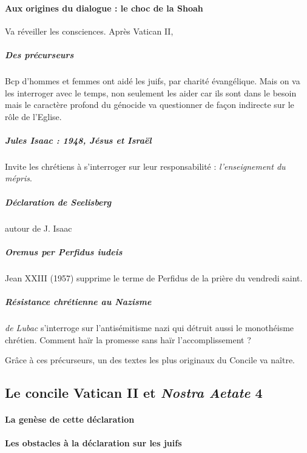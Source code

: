     \paragraph{Aux origines du dialogue : le choc de la Shoah}
    Va réveiller les consciences. Après Vatican II, 
    
    \subparagraph{Des précurseurs} Bcp d'hommes et femmes ont aidé les juifs, par charité évangélique. Mais on va les interroger avec le temps, non seulement les aider car ils sont dans le besoin mais le caractère profond du génocide va questionner de façon indirecte sur le rôle de l'Eglise.
    
    \subparagraph{Jules Isaac : 1948, Jésus et Israël} Invite les chrétiens à s'interroger sur leur responsabilité : \textit{l'enseignement du mépris}. 
    
    \subparagraph{Déclaration de Seelisberg} autour de J. Isaac 
    
    \subparagraph{Oremus per Perfidus iudeis} Jean XXIII (1957) supprime le terme de Perfidus de la prière du vendredi saint. 
    
    \subparagraph{Résistance chrétienne au Nazisme}
    \textit{de Lubac} s'interroge sur l'antisémitisme nazi qui détruit aussi le monothéisme chrétien.  Comment haïr la promesse sans haïr l'accomplissement ?  
  
  Grâce à ces précurseurs, un des textes les plus originaux du Concile va naître.
  

  
  \subsection{Le concile Vatican II et \emph{Nostra Aetate} 4}
  

  
  \def\labelenumii{\arabic{enumii}.}
  
    
    \paragraph{La genèse de cette déclaration}
    
  
    
    \paragraph{Les obstacles à la déclaration sur les juifs}
    
